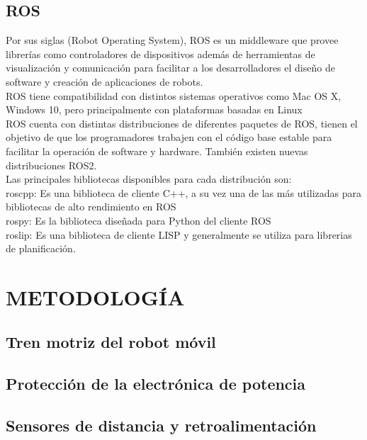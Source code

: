 \documentclass[12pt]{book} %
\begin{document}
	\section{ROS}
Por sus siglas (Robot Operating System), ROS es un middleware que provee librerías como controladores de dispositivos además de herramientas de visualización y comunicación  para facilitar a los desarrolladores el diseño de software y creación de aplicaciones de robots.\\
ROS tiene compatibilidad con distintos sistemas operativos como Mac OS X, Windows 10, pero principalmente con plataformas basadas en Linux\\
ROS cuenta con distintas distribuciones de diferentes paquetes de ROS, tienen el objetivo de que los programadores trabajen con el código base estable para facilitar la operación de software y hardware. También existen nuevas distribuciones ROS2.\\
Las principales bibliotecas disponibles para cada distribución son:\\
roscpp: Es una biblioteca de cliente C++, a su vez una de las más utilizadas para bibliotecas de alto rendimiento en ROS\\
rospy: Es la biblioteca diseñada para Python del cliente ROS\\
roslip:  Es una biblioteca de cliente LISP y generalmente se utiliza para librerias de planificación.\\


\chapter{METODOLOGÍA} \label{METODOLOGÍA}

\section{Tren motriz del robot móvil} %
 \lhead[]{}


	\section{Protección de la electrónica de potencia}
		
		
	\section{Sensores de distancia y retroalimentación
}
		
\end{document}
